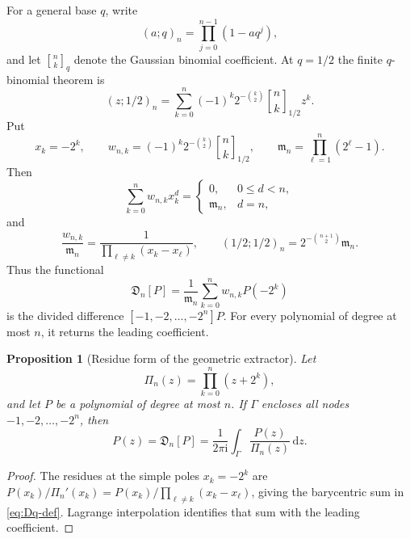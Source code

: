 \documentclass[11pt,oneside]{article}
\newtheorem{proposition}[theorem]{Proposition}
\theoremstyle{definition}
\theoremstyle{remark}
\newcommand{\ii}{\mathrm i}
\newcommand{\dd}{\,\mathrm d}
\newcommand{\qbinom}[3]{\genfrac{[}{]}{0pt}{}{#1}{#2}_{#3}}
\newcommand{\Dq}{\mathfrak D}
\begin{document}
For a general base $q$, write
\begin{equation}
 (a;q)_n=\prod_{j=0}^{n-1}(1-aq^j),                       \label{eq:qpoch-def-local}
\end{equation}
and let $\qbinom nkq$ denote the Gaussian binomial coefficient.  At $q=1/2$ the finite
$q$-binomial theorem is
\begin{equation}
 (z;1/2)_n=\sum_{k=0}^{n}(-1)^k2^{-\binom k2}
 \qbinom nk{1/2}z^k.                                      \label{eq:finite-q-binomial-local}
\end{equation}
Put
\begin{equation}
 x_k=-2^k,
 \qquad
 w_{n,k}=(-1)^k2^{-\binom k2}\qbinom nk{1/2},
 \qquad
 \mathfrak m_n=\prod_{\ell=1}^{n}(2^\ell-1).              \label{eq:q-nodes-weights}
\end{equation}
Then
\begin{equation}
 \sum_{k=0}^{n}w_{n,k}x_k^d=
 \begin{cases}
 0,&0\le d<n,\\
 \mathfrak m_n,&d=n,
 \end{cases}                                               \label{eq:q-node-moments}
\end{equation}
and
\begin{equation}
 \frac{w_{n,k}}{\mathfrak m_n}
 =\frac1{\prod_{\ell\ne k}(x_k-x_\ell)},
 \qquad
 (1/2;1/2)_n=2^{-\binom{n+1}{2}}\mathfrak m_n.             \label{eq:q-barycentric-normalization}
\end{equation}
Thus the functional
\begin{equation}
 \Dq_n[P]=\frac1{\mathfrak m_n}\sum_{k=0}^{n}w_{n,k}P(-2^k) \label{eq:Dq-def}
\end{equation}
is the divided difference $[-1,-2,\ldots,-2^n]P$.  For every polynomial of degree at most
$n$, it returns the leading coefficient.

\begin{proposition}[Residue form of the geometric extractor]
\label{prop:q-residue-extractor}
Let
\[
 \Pi_n(z)=\prod_{k=0}^{n}(z+2^k),
\]
and let $P$ be a polynomial of degree at most $n$.  If $\Gamma$ encloses all nodes
$-1,-2,\ldots,-2^n$, then
\begin{equation}
 [z^n]P(z)=\Dq_n[P]
 =\frac{1}{2\pi\ii}\int_\Gamma\frac{P(z)}{\Pi_n(z)}\dd z. \label{eq:q-residue-extractor}
\end{equation}
\end{proposition}

\begin{proof}
The residues at the simple poles $x_k=-2^k$ are
$P(x_k)/\Pi_n'(x_k)=P(x_k)/\prod_{\ell\ne k}(x_k-x_\ell)$, giving the barycentric sum in
\eqref{eq:Dq-def}.  Lagrange interpolation identifies that sum with the leading coefficient.
\end{proof}
\end{document}
